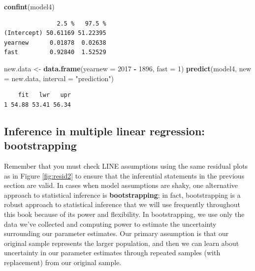 \documentclass[
]{krantz}
\newenvironment{Shaded}{\begin{snugshade}}{\end{snugshade}}
\newcommand{\DataTypeTok}[1]{\textcolor[rgb]{0.27,0.27,0.27}{#1}}
\newcommand{\DecValTok}[1]{\textcolor[rgb]{0.06,0.06,0.06}{#1}}
\newcommand{\KeywordTok}[1]{\textcolor[rgb]{0.27,0.27,0.27}{\textbf{#1}}}
\newcommand{\NormalTok}[1]{#1}
\newcommand{\OperatorTok}[1]{\textcolor[rgb]{0.43,0.43,0.43}{\textbf{#1}}}
\newcommand{\StringTok}[1]{\textcolor[rgb]{0.5,0.5,0.5}{#1}}
\begin{document}
\begin{Shaded}
\begin{Highlighting}[]
\KeywordTok{confint}\NormalTok{(model4)}
\end{Highlighting}
\end{Shaded}

\begin{verbatim}
               2.5 %   97.5 %
(Intercept) 50.61169 51.22395
yearnew      0.01878  0.02638
fast         0.92840  1.52529
\end{verbatim}

\begin{Shaded}
\begin{Highlighting}[]
\NormalTok{new.data <-}\StringTok{ }\KeywordTok{data.frame}\NormalTok{(}\DataTypeTok{yearnew =} \DecValTok{2017} \OperatorTok{-}\StringTok{ }\DecValTok{1896}\NormalTok{, }\DataTypeTok{fast =} \DecValTok{1}\NormalTok{) }
\KeywordTok{predict}\NormalTok{(model4, }\DataTypeTok{new =}\NormalTok{ new.data, }\DataTypeTok{interval =} \StringTok{"prediction"}\NormalTok{)}
\end{Highlighting}
\end{Shaded}

\begin{verbatim}
    fit   lwr   upr
1 54.88 53.41 56.34
\end{verbatim}

\hypertarget{multreg-boot}{%
\subsection{Inference in multiple linear regression: bootstrapping}\label{multreg-boot}}

Remember that you must check LINE assumptions using the same residual plots as in Figure \ref{fig:resid2} to ensure that the inferential statements in the previous section are valid. In cases when model assumptions are shaky, one alternative approach to statistical inference is \textbf{bootstrapping};  in fact, bootstrapping is a robust approach to statistical inference that we will use frequently throughout this book because of its power and flexibility. In bootstrapping, we use only the data we've collected and computing power to estimate the uncertainty surrounding our parameter estimates. Our primary assumption is that our original sample represents the larger population, and then we can learn about uncertainty in our parameter estimates through repeated samples (with replacement) from our original sample.
\end{document}
